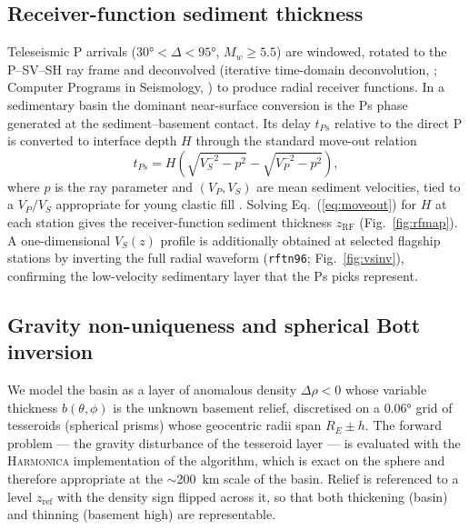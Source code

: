 \subsection{Receiver-function sediment thickness}\label{sec:rf}
Teleseismic P arrivals ($30\si{\degree}<\Delta<95\si{\degree}$, $M_w\ge5.5$) are
windowed, rotated to the P--SV--SH ray frame and deconvolved (iterative
time-domain deconvolution, \citealp{Ligorria1999}; Computer Programs in
Seismology, \citealp{Herrmann2013}) to produce radial receiver functions. In a
sedimentary basin the dominant near-surface conversion is the Ps phase generated
at the sediment--basement contact. Its delay $t_{Ps}$ relative to the direct P is
converted to interface depth $H$ through the standard move-out relation
\begin{equation}
t_{Ps}=H\left(\sqrt{V_S^{-2}-p^{2}}-\sqrt{V_P^{-2}-p^{2}}\right),
\label{eq:moveout}
\end{equation}
where $p$ is the ray parameter and $(V_P,V_S)$ are mean sediment velocities, tied
to a $V_P/V_S$ appropriate for young clastic fill \citep{Brocher2005}. Solving
Eq.~(\ref{eq:moveout}) for $H$ at each station gives the receiver-function
sediment thickness $z_{\mathrm{RF}}$ (Fig.~\ref{fig:rfmap}). A one-dimensional
$V_S(z)$ profile is additionally obtained at selected flagship stations by
inverting the full radial waveform (\texttt{rftn96}; Fig.~\ref{fig:vsinv}),
confirming the low-velocity sedimentary layer that the Ps picks represent.

\subsection{Gravity non-uniqueness and spherical Bott inversion}\label{sec:grav}
We model the basin as a layer of anomalous density $\Delta\rho<0$ whose variable
thickness $b(\theta,\phi)$ is the unknown basement relief, discretised on a
$0.06\si{\degree}$ grid of tesseroids (spherical prisms) whose geocentric radii
span $R_E\!\pm\!h$. The forward problem --- the gravity disturbance of the
tesseroid layer --- is evaluated with the \textsc{Harmonica} implementation of
the \citet{Uieda2017} algorithm, which is exact on the sphere and therefore
appropriate at the $\sim$200~km scale of the basin. Relief is referenced to a
level $z_{\mathrm{ref}}$ with the density sign flipped across it, so that both
thickening (basin) and thinning (basement high) are representable.

